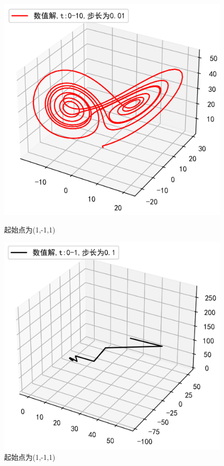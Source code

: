 \documentclass[a4paper]{article}%
\begin{document}
\begin{figure}[h]
    \begin{minipage}[h]{0.48\linewidth}
    \centering
    \includegraphics[scale=0.65]{33}
    \caption{起始点为(1,-1,1)}\end{minipage}
    \begin{minipage}[h]{0.48\linewidth}
    \centering
    \includegraphics[scale=0.65]{34}
    \caption{起始点为(1,-1,1)}
    \end{minipage}
\end{figure}
\end{document}
